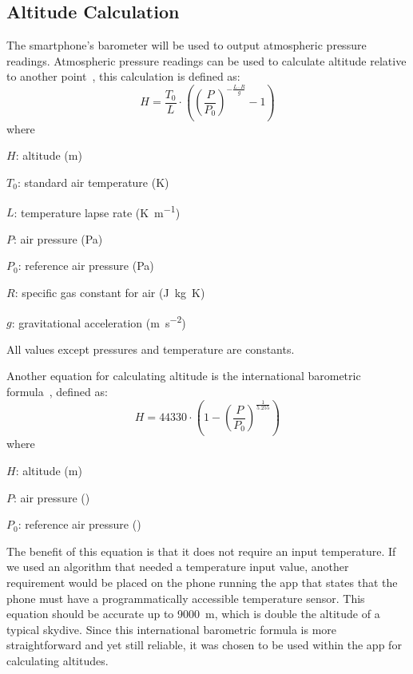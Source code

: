 \subsection{Altitude Calculation}
The smartphone's barometer will be used to output atmospheric pressure readings. Atmospheric pressure readings can be used to calculate altitude relative to another point~\cite{he_atmospheric_2012, liu_beyond_2014}, this calculation is defined as:
\begin{equation}\label{eq:altitude-calculation}
  H = \frac{T_0}{L} \cdot \left({\left(\frac{P}{P_0}\right)}^{-\frac{L \cdot R}{g}} - 1\right)
\end{equation}
where
\begin{description}
  \item $H$: altitude (\si{\metre})
  \item $T_0$: standard air temperature (\si{\kelvin})
  \item $L$: temperature lapse rate (\si{\kelvin\per\metre})
  \item $P$: air pressure (\si{\pascal})
  \item $P_0$: reference air pressure (\si{\pascal})
  \item $R$: specific gas constant for air (\si{\joule\kilogram\kelvin})
  \item $g$: gravitational acceleration (\si{\metre\per\second\squared})
\end{description}

All values except pressures and temperature are constants.

Another equation for calculating altitude is the international barometric formula~\cite{bosch_bmp180:_2018}, defined as:
\begin{equation}\label{eq:barometric-fomula}
  H = 44330 \cdot \left(1 - {\left(\frac{P}{P_0}\right)}^{\frac{1}{5.255}}\right)
\end{equation}
where
\begin{description}
  \item $H$: altitude (\si{\metre})
  \item $P$: air pressure (\si{\hPa})
  \item $P_0$: reference air pressure (\si{\hPa})
\end{description}

The benefit of this equation is that it does not require an input temperature. If we used an algorithm that needed a temperature input value, another requirement would be placed on the phone running the app that states that the phone must have a programmatically accessible temperature sensor. This equation should be accurate up to \SI{9000}{\metre}, which is double the altitude of a typical skydive. Since this international barometric formula is more straightforward and yet still reliable, it was chosen to be used within the app for calculating altitudes.

